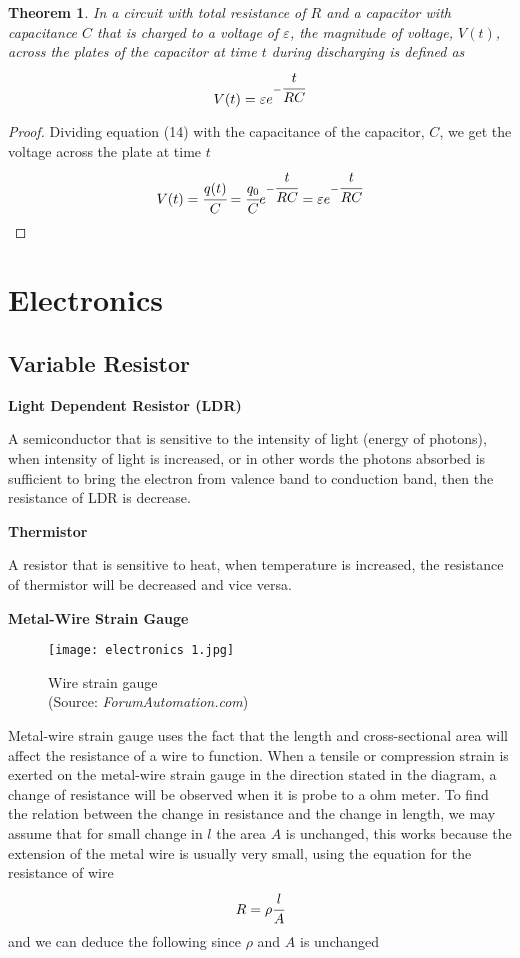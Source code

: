 \documentclass{article}
\newtheorem{theorem}{Theorem}[subsection]
\begin{document}
\begin{theorem}
In a circuit with total resistance of $R$ and a capacitor with capacitance $C$ that is charged to a voltage of $\varepsilon$, the magnitude of voltage, $V(t)$, across the plates of the capacitor at time $t$ during discharging is defined as
$$V(t)=\varepsilon e^{-\cfrac{t}{RC}}$$
\end{theorem}
\begin{proof}
Dividing equation (14) with the capacitance of the capacitor, $C$, we get the voltage across the plate at time $t$
$$V(t)=\cfrac{q(t)}{C}=\cfrac{q_0}{C}e^{-\cfrac{t}{RC}}=\varepsilon e^{-\cfrac{t}{RC}}$$
\end{proof}
\newpage 
 \section{Electronics}
 
 \subsection{Variable Resistor}
 
 \begin{flushleft}
 \textbf{Light Dependent Resistor (LDR)}
 \end{flushleft}
 A semiconductor that is sensitive to the intensity of light (energy of photons), when intensity of light is increased, or in other words the photons absorbed is sufficient to bring the electron from valence band to conduction band, then the resistance of LDR is decrease. 
 
  \begin{flushleft}
 \textbf{Thermistor}
 \end{flushleft}
 A resistor that is sensitive to heat, when temperature is increased, the resistance of thermistor will be decreased and vice versa.
 
 \begin{flushleft}
 \textbf{Metal-Wire Strain Gauge}
 \end{flushleft}
 \begin{figure}[H]
     \centering
     \captionsetup{justification=centering,margin=2cm}
     \texttt{[image: electronics 1.jpg]}
     \caption*{Wire strain gauge \\ (Source: \textit{ForumAutomation.com})}
 \end{figure}
 Metal-wire strain gauge uses the fact that the length and cross-sectional area will affect the resistance of a wire to function. When a tensile or compression strain is exerted on the metal-wire strain gauge in the direction stated in the diagram, a change of resistance will be observed when it is probe to a ohm meter. To find the relation between the change in resistance and the change in length, we may assume that for small change in $l$ the area $A$ is unchanged, this works because the extension of the metal wire is usually very small, using the equation for the resistance of wire
$$R=\rho\cfrac{l}{A}$$
 and we can deduce the following since $\rho$ and $A$ is unchanged
 
\end{document}
